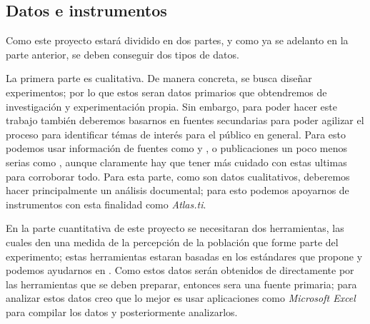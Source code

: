 \documentclass[12pt]{article}
\begin{document}
	
	\subsection {Datos e instrumentos}
		\par Como este proyecto estará dividido en dos partes, y como ya se adelanto en la parte anterior, se deben conseguir dos tipos de datos. 
		\par La primera parte es cualitativa. De manera concreta, se busca diseñar experimentos; por lo que estos seran datos primarios que obtendremos de investigación y experimentación propia. Sin embargo, para poder hacer este trabajo también deberemos basarnos en fuentes secundarias para poder agilizar el proceso para identificar témas de interés para el público en general. Para esto podemos usar información de fuentes como \cite{biot vida 1} y \cite{biot vida 2}, o publicaciones un poco menos serias como \cite{biot informal}, aunque claramente hay que tener más cuidado con estas ultimas para corroborar todo. Para esta parte, como son datos cualitativos, deberemos hacer principalmente un análisis documental; para esto podemos apoyarnos de instrumentos con esta finalidad como \textit{Atlas.ti}.
		\par En la parte cuantitativa de este proyecto se necesitaran dos herramientas, las cuales den una medida de la percepción de la población que forme parte del experimento; estas herramientas estaran basadas en los estándares que propone \cite{instrumento 1} y podemos ayudarnos en \cite{instrumento 2}. Como estos datos serán obtenidos de directamente por las herramientas que se deben preparar, entonces sera una fuente primaria; para analizar estos datos creo que lo mejor es usar aplicaciones como \textit{Microsoft Excel} para compilar los datos y posteriormente analizarlos.
		
		
		
\end{document}
